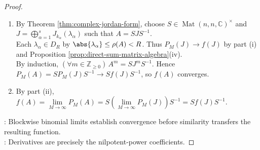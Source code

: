 \begin{theorem}
\begin{proof}
\begin{enumerate}[label=(\roman*)]
For $m\geq r$, $\frac{m!}{(m-r)!}\abs{c_m}\abs{\lambda}^{m-r}\leq\abs{\lambda}^{-r}m^r(\abs{\lambda}/\eta)^m\abs{c_m}\eta^m$.\\
Hence each differentiated series defining $F_k(\lambda)$ converges absolutely.\\
For $M\in\mathbb{Z}_{\geq0}$, $P_M(J_k(\lambda))=\sum\limits_{r=0}^{k-1}\left(\sum\limits_{m=r}^{M}c_m\binom{m}{r}\lambda^{m-r}\right)N^r$, with an empty inner sum interpreted as $0$.\\
For $r\in\{0,\ldots,k-1\}$, the coefficient tends to $\frac{f^{(r)}(\lambda)}{r!}$. The outer sum is finite, so $P_M(J_k(\lambda))\to F_k(\lambda)$.
\item By Theorem \ref{thm:complex-jordan-form}, choose $S\in\operatorname{Mat}(n,n,\mathbb{C})^{\times}$ and $J=\bigoplus\limits_{\alpha=1}^sJ_{k_{\alpha}}(\lambda_{\alpha})$ such that $A=SJS^{-1}$.\\
Each $\lambda_{\alpha}\in D_R$ by $\abs{\lambda_{\alpha}}\leq\rho(A)<R$. Thus $P_M(J)\to f(J)$ by part (i) and Proposition \ref{prop:direct-sum-matrix-algebra}(iv).\\
By induction, $(\forall m\in\mathbb{Z}_{\geq0})\,A^m=SJ^mS^{-1}$. Hence $P_M(A)=SP_M(J)S^{-1}\to Sf(J)S^{-1}$, so $f(A)$ converges.
\item By part (ii), $f(A)=\lim\limits_{M\to\infty}P_M(A)=S\left(\lim\limits_{M\to\infty}P_M(J)\right)S^{-1}=Sf(J)S^{-1}$.
\end{enumerate}
: Blockwise binomial limits establish convergence before similarity transfers the resulting function.\\
: Derivatives are precisely the nilpotent-power coefficients.
\end{proof}
\end{theorem}

